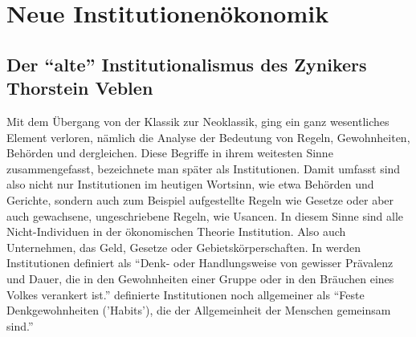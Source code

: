 %
%
%

\chapter{Neue Institutionenökonomik}
\label{Neue Institut}

\section{Der "`alte"' Institutionalismus des Zynikers Thorstein Veblen}

Mit dem Übergang von der Klassik zur Neoklassik, ging ein ganz wesentliches Element verloren, nämlich die Analyse der Bedeutung von Regeln, Gewohnheiten, Behörden und dergleichen. Diese Begriffe in ihrem weitesten Sinne zusammengefasst, bezeichnete man später als Institutionen. Damit umfasst sind also nicht nur Institutionen im heutigen Wortsinn, wie etwa Behörden und Gerichte, sondern auch zum Beispiel aufgestellte Regeln wie Gesetze oder aber auch gewachsene, ungeschriebene Regeln, wie Usancen. In diesem Sinne sind alle Nicht-Individuen in der ökonomischen Theorie Institution. Also auch Unternehmen, das Geld, Gesetze oder Gebietskörperschaften. In \textcite[S. 179]{Hodgson1998} werden Institutionen definiert als "`Denk- oder Handlungsweise von gewisser Prävalenz und Dauer, die in den Gewohnheiten einer Gruppe oder in den Bräuchen eines Volkes verankert ist."' \textcite[S. 239]{Veblen1919} definierte Institutionen noch allgemeiner als "`Feste Denkgewohnheiten ('Habits'), die der Allgemeinheit der Menschen gemeinsam sind."'

